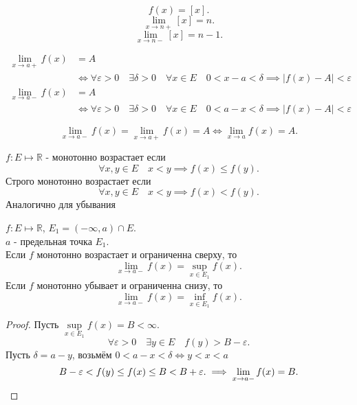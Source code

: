 \documentclass[11pt, oneside]{article}   	%
\begin{document}
    \begin{example}
        \[ f(x) = \left[x\right] .\]
        \[ \lim\limits_{x \to n+} \left[x\right] = n.\]
        \[ \lim\limits_{x \to n-} \left[x\right] = n - 1.\] 
    \end{example}
    \begin{dlemma}
        \begin{equation*}
            \begin{split}
                \lim\limits_{x \to a+} f(x) &= A\\
                &\iff \forall{\varepsilon>0}\quad \exists{\delta > 0}\quad \forall{x\in E}\quad 0<x-a<\delta \implies |f(x) - A| < \varepsilon 
            \end{split} 
        \end{equation*}
        \begin{equation*}
            \begin{split}
                \lim\limits_{x \to a-} f(x) &= A\\
                &\iff \forall{\varepsilon>0}\quad \exists{\delta > 0}\quad \forall{x\in E}\quad 0<a-x<\delta \implies |f(x) - A| < \varepsilon 
            \end{split} 
        \end{equation*}
    \end{dlemma}
    \begin{dlemma}
        \[ \lim\limits_{x \to a-} f(x) = \lim\limits_{x \to a+} f(x) = A \iff \lim\limits_{x \to a} f(x) = A .\] 
    \end{dlemma}
    \begin{definition}
        $f: E \mapsto \mathbb{R}$ - монотонно возрастает если
        \[ \forall{x, y\in E}\quad x<y \implies f(x) \le  f(y) .\]
        Строго монотонно возрастает если
        \[ \forall{x,y\in E}\quad x<y \implies f(x) < f(y)  .\]
        Аналогично для убывания
    \end{definition}
    \begin{dlemma}
        $f: E \mapsto \mathbb{R}$, $E_1 = \left( -\infty, a \right)\cap E$.\\
        $a$ - предельная точка $ E_1$.\\
        Если $f$ монотонно возрастает и ограниченна сверху, то 
        \[ \lim\limits_{x \to a-} f(x) = \sup\limits_{x\in E_1} f(x) .\]
        Если $f$ монотонно убывает и ограниченна снизу, то
        \[ \lim\limits_{x \to a-} f(x) = \inf\limits_{x\in E_1} f(x)  .\]
        \begin{proof}
            Пусть $\sup\limits_{x\in E_1} f(x) = B < \infty$.\\
            \[ \forall{\varepsilon>0}\quad \exists{y\in E}\quad f(y)>B-\varepsilon .\]
            Пусть $\delta = a-y$, возьмём $0<a-x<\delta \iff y<x<a$\\
            \[ B-\varepsilon < f(y) \le f(x) \le B < B+\varepsilon. \implies \lim\limits_{x \to a-} f(x) = B.\qedhere\]
        \end{proof}
    \end{dlemma}
\end{document}
